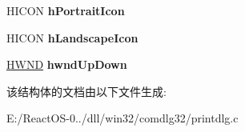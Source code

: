 \begin{DoxyCompactItemize}
\mbox{\label{struct_p_r_i_n_t___p_t_r_w_a823e2e725ec36826df530f519a8654e1}} 
H\+I\+C\+ON {\bfseries h\+Portrait\+Icon}
\item 
\mbox{\label{struct_p_r_i_n_t___p_t_r_w_a29f2363dd62e18b618cad340d5ffa481}} 
H\+I\+C\+ON {\bfseries h\+Landscape\+Icon}
\item 
\mbox{\label{struct_p_r_i_n_t___p_t_r_w_a3be1d9a6a7f32144c0ac93329e50a0f7}} 
\hyperlink{interfacevoid}{H\+W\+ND} {\bfseries hwnd\+Up\+Down}
\end{DoxyCompactItemize}


该结构体的文档由以下文件生成\+:\begin{DoxyCompactItemize}
\item 
E\+:/\+React\+O\+S-\/0../dll/win32/comdlg32/printdlg.\+c\end{DoxyCompactItemize}
